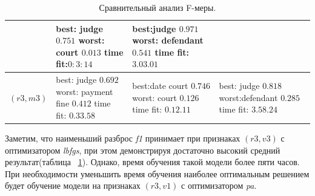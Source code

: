 \documentclass{csmathnotes}
\begin{document}
\begin{table}[!h]
\begin{center}
\begin{tabular}{|p{3.1cm}|p{2.5cm}|p{2.5cm}|p{2.5cm}|}
            & best: \newline judge    $0.751$ \newline
              worst: \newline court  $0.013$ \newline
              time fit:\newline $0:3:14$
            & best:\newline  judge $0.971$\newline
              worst: \newline defendant  $0.541$\newline
              time fit:\newline $3.03.01$\\
            \hline
            $(r3, m3)$
            & best: \newline judge $0.692$ \newline
            worst: \newline payment fine $0.412$ \newline
            time fit: \newline  $0.33.58$
            & best:\newline   date court   $0.746$ \newline
             worst: \newline court $0.126$ \newline
             time fit: \newline $0.12.11$
            & best: \newline   judge $0.818$ \newline
              worst:\newline defendant $0.285$ \newline 
              time fit: \newline $3.58.24$\\
            \hline
        \end{tabular}
    \end{center}
    \caption{\label{tabl:table2}Сравнительный анализ F-меры.}
\end{table}

Заметим, что наименьший разброс \emph{f1}  принимает при признаках $(r3,v3)$ с оптимизатором \emph{lbfgs}, при этом демонстрируя достаточно высокий средний результат(таблица ~\ref{tabl:table2}). Однако, время обучения такой модели более пяти часов. При необходимости уменьшить время обучения наиболее оптимальным решением будет обучение модели на признаках $(r3,v1)$ с оптимизатором \emph{pa}.
\end{document}
